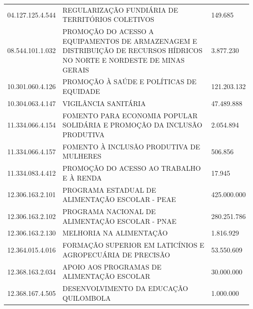 \documentclass{article}
\begin{document}
\begin{longtable}[c]{m{3cm}|m{12cm}|m{2cm}}
\multicolumn{1}{C{3cm}|}{04.127.125.4.544} & \multicolumn{1}{L{12cm}|}{REGULARIZAÇÃO FUNDIÁRIA DE TERRITÓRIOS COLETIVOS} & \multicolumn{1}{R{2cm}}{149.685} \\
\multicolumn{1}{C{3cm}|}{08.544.101.1.032} & \multicolumn{1}{L{12cm}|}{PROMOÇÃO DO ACESSO A EQUIPAMENTOS DE ARMAZENAGEM E DISTRIBUIÇÃO DE RECURSOS HÍDRICOS NO NORTE E NORDESTE DE MINAS GERAIS} & \multicolumn{1}{R{2cm}}{3.877.230} \\
\multicolumn{1}{C{3cm}|}{10.301.060.4.126} & \multicolumn{1}{L{12cm}|}{PROMOÇÃO À SAÚDE E POLÍTICAS DE EQUIDADE} & \multicolumn{1}{R{2cm}}{121.203.132} \\
\multicolumn{1}{C{3cm}|}{10.304.063.4.147} & \multicolumn{1}{L{12cm}|}{VIGILÂNCIA SANITÁRIA} & \multicolumn{1}{R{2cm}}{47.489.888} \\
\multicolumn{1}{C{3cm}|}{11.334.066.4.154} & \multicolumn{1}{L{12cm}|}{FOMENTO PARA ECONOMIA POPULAR SOLIDÁRIA E PROMOÇÃO DA INCLUSÃO PRODUTIVA} & \multicolumn{1}{R{2cm}}{2.054.894} \\
\multicolumn{1}{C{3cm}|}{11.334.066.4.157} & \multicolumn{1}{L{12cm}|}{FOMENTO À INCLUSÃO PRODUTIVA DE MULHERES} & \multicolumn{1}{R{2cm}}{506.856} \\
\multicolumn{1}{C{3cm}|}{11.334.083.4.412} & \multicolumn{1}{L{12cm}|}{PROMOÇÃO DO ACESSO AO TRABALHO E À RENDA} & \multicolumn{1}{R{2cm}}{17.945} \\
\multicolumn{1}{C{3cm}|}{12.306.163.2.101} & \multicolumn{1}{L{12cm}|}{PROGRAMA ESTADUAL DE ALIMENTAÇÃO ESCOLAR - PEAE} & \multicolumn{1}{R{2cm}}{425.000.000} \\
\multicolumn{1}{C{3cm}|}{12.306.163.2.102} & \multicolumn{1}{L{12cm}|}{PROGRAMA NACIONAL DE ALIMENTAÇÃO ESCOLAR - PNAE} & \multicolumn{1}{R{2cm}}{280.251.786} \\
\multicolumn{1}{C{3cm}|}{12.306.163.2.130} & \multicolumn{1}{L{12cm}|}{MELHORIA NA ALIMENTAÇÃO} & \multicolumn{1}{R{2cm}}{1.816.929} \\
\multicolumn{1}{C{3cm}|}{12.364.015.4.016} & \multicolumn{1}{L{12cm}|}{FORMAÇÃO SUPERIOR EM LATICÍNIOS E AGROPECUÁRIA DE PRECISÃO} & \multicolumn{1}{R{2cm}}{53.550.609} \\
\multicolumn{1}{C{3cm}|}{12.368.163.2.034} & \multicolumn{1}{L{12cm}|}{APOIO AOS PROGRAMAS DE ALIMENTAÇÃO ESCOLAR} & \multicolumn{1}{R{2cm}}{30.000.000} \\
\multicolumn{1}{C{3cm}|}{12.368.167.4.505} & \multicolumn{1}{L{12cm}|}{DESENVOLVIMENTO DA EDUCAÇÃO QUILOMBOLA} & \multicolumn{1}{R{2cm}}{1.000.000} \\

\end{longtable}
\end{document}
